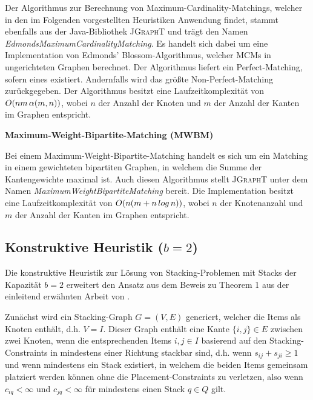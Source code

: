 Der Algorithmus zur Berechnung von Maximum-Cardinality-Matchings, welcher in den im Folgenden
vorgestellten Heuristiken Anwendung findet, stammt ebenfalls aus der Java-Bibliothek \textsc{JGraphT} \cite{JGraphT} und trägt
den Namen \textit{EdmondsMaximumCardinalityMatching}. Es handelt sich dabei um eine Implementation von Edmonds' Blossom-Algorithmus,
welcher MCMs in ungerichteten Graphen berechnet. Der Algorithmus liefert ein Perfect-Matching, sofern eines existiert.
Andernfalls wird das größte Non-Perfect-Matching zurückgegeben.
Der Algorithmus besitzt eine Laufzeitkomplexität von $O(nm \thinspace \alpha(m, n))$, wobei $n$ der Anzahl der Knoten
und $m$ der Anzahl der Kanten im Graphen entspricht.

\vfill
\pagebreak

\textbf{Maximum-Weight-Bipartite-Matching (MWBM)}

Bei einem Maximum-Weight-Bipartite-Matching handelt es sich um ein Matching in einem gewichteten bipartiten Graphen,
in welchem die Summe der Kantengewichte maximal ist. Auch diesen Algorithmus stellt \textsc{JGraphT} \cite{JGraphT}
unter dem Namen \textit{MaximumWeightBipartiteMatching} bereit.
Die Implementation besitzt eine Laufzeitkomplexität von $O(n (m + n \thinspace log \thinspace n))$, wobei $n$ der Knotenanzahl
und $m$ der Anzahl der Kanten im Graphen entspricht.

\subsection{Konstruktive Heuristik ($b = 2$)}
\label{sec:two_cap_heuristic}

Die konstruktive Heuristik zur Lösung von Stacking-Problemen mit Stacks der Kapazität $b=2$ erweitert den Ansatz aus dem Beweis
zu Theorem 1 aus der einleitend erwähnten Arbeit von \citet{Bruns2015}.

Zunächst wird ein Stacking-Graph $G = (V, E)$ generiert, welcher die Items als Knoten enthält, d.h. $V = I$. Dieser Graph
enthält eine Kante $\{i, j\} \in E$ zwischen zwei Knoten, wenn die entsprechenden Items $i, j \in I$ basierend auf den Stacking-Constraints
in mindestens einer Richtung stackbar sind, d.h. wenn $s_{ij} + s_{ji} \geq 1$ und wenn mindestens ein Stack existiert, in welchem die beiden Items gemeinsam platziert werden können ohne die Placement-Constraints zu verletzen, also wenn $c_{iq} < \infty$ und $c_{jq} < \infty$ für
mindestens einen Stack $q \in Q$ gilt.

